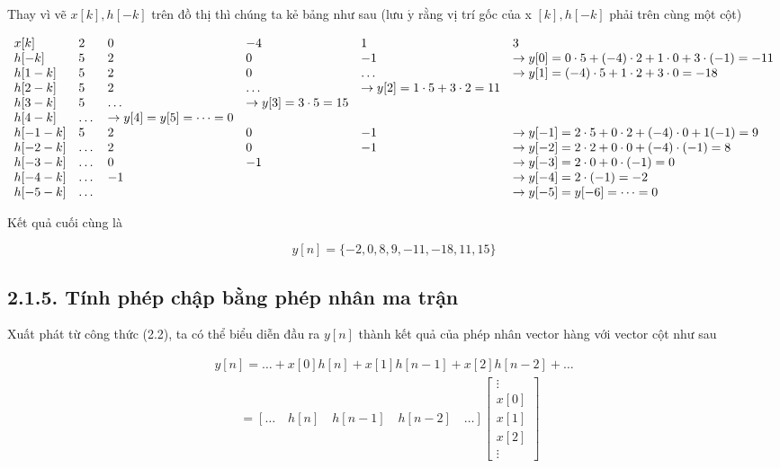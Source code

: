 \documentclass[
  10
]{article}
\begin{document}
Thay vì vẽ \(x [ k ] , h [ - k ]\) trên đồ thị thì chúng ta kẻ bảng như
sau (lưu \(\acute { \mathrm { y } }\) rằng vị trí gốc của x
\([ k ] , h [ - k ]\) phải trên cùng một cột)

\[
\begin{array}{l l l l l l l l} x [ k ] & 2 & 0 & - 4 & 1 & 3 \\ h [ - k ] & 5 & 2 & 0 & - 1 & \to y [ 0 ] = 0 \cdot 5 + (- 4) \cdot 2 + 1 \cdot 0 + 3 \cdot (- 1) = - 1 1 \\ h [ 1 - k ] & 5 & 2 & 0 & \dots & \to y [ 1 ] = (- 4) \cdot 5 + 1 \cdot 2 + 3 \cdot 0 = - 1 8 \\ h [ 2 - k ] & 5 & 2 & \dots & \to y [ 2 ] = 1 \cdot 5 + 3 \cdot 2 = 1 1 \\ h [ 3 - k ] & 5 & \dots & \to y [ 3 ] = 3 \cdot 5 = 1 5 \\ h [ 4 - k ] & \dots & \to y [ 4 ] = y [ 5 ] = \dots = 0 \\ h [ - 1 - k ] & 5 & 2 & 0 & - 1 & \to y [ - 1 ] = 2 \cdot 5 + 0 \cdot 2 + (- 4) \cdot 0 + 1 (- 1) = 9 \\ h [ - 2 - k ] & \dots & 2 & 0 & - 1 & \to y [ - 2 ] = 2 \cdot 2 + 0 \cdot 0 + (- 4) \cdot (- 1) = 8 \\ h [ - 3 - k ] & \dots & 0 & - 1 & & \to y [ - 3 ] = 2 \cdot 0 + 0 \cdot (- 1) = 0 \\ h [ - 4 - k ] & \dots & - 1 & & & \to y [ - 4 ] = 2 \cdot (- 1) = - 2 \\ h [ - 5 - k ] & \dots & & & & \to y [ - 5 ] = y [ - 6 ] = \dots = 0 \end{array}
\]

Kết quả cuối cùng là

\[
y [ n ] = \{- 2, 0, 8, 9, - 1 1, - 1 8, 1 1, 1 5 \}
\]

\subsection{2.1.5. Tính phép chập bằng phép nhân ma
trận}\label{tuxednh-phuxe9p-chux1eadp-bux1eb1ng-phuxe9p-nhuxe2n-ma-trux1eadn}

Xuất phát từ công thức (2.2), ta có thể biểu diễn đầu ra \(y [ n ]\)
thành kết quả của phép nhân vector hàng với vector cột như sau

\[
\begin{array}{l} y [ n ] = \dots + x [ 0 ] h [ n ] + x [ 1 ] h [ n - 1 ] + x [ 2 ] h [ n - 2 ] + \dots \\ \qquad = \left[ \dots \quad h [ n ] \quad h [ n - 1 ] \quad h [ n - 2 ] \quad \dots \right] \left[ \begin{array}{c} \vdots \\ x [ 0 ] \\ x [ 1 ] \\ x [ 2 ] \\ \vdots \end{array} \right] \end{array}
\]
\end{document}
